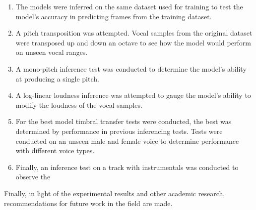 \begin{enumerate}
    \item The models were inferred on the same dataset used for training to test the model's accuracy in predicting frames from the training dataset.
    \item A pitch transposition was attempted. Vocal samples from the original dataset were transposed up and down an octave to see how the model would perform on unseen vocal ranges.
    \item A mono-pitch inference test was conducted to determine the model's ability at producing a single pitch.
    \item A log-linear loudness inference was attempted to gauge the model's ability to modify the loudness of the vocal samples.
    \item For the best model timbral transfer tests were conducted, the best was determined by performance in previous inferencing tests. Tests were conducted on an unseen male and female voice to determine performance with different voice types.
    \item Finally, an inference test on a track with instrumentals was conducted to observe the 
\end{enumerate}

Finally, in light of the experimental results and other academic research, recommendations for future work in the field are made.